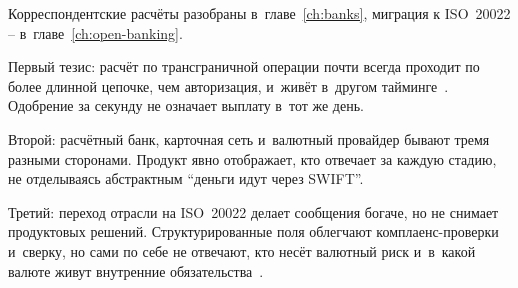 Корреспондентские расчёты разобраны в~главе~\ref{ch:banks},
миграция к ISO~20022 -- в~главе~\ref{ch:open-banking}.

Первый тезис: расчёт по трансграничной операции почти всегда
проходит по более длинной цепочке, чем авторизация, и~живёт
в~другом тайминге~\cite{fatf-correspondent-banking,swift-instant-interoperability}.
Одобрение за секунду не означает выплату в~тот же день.

Второй: расчётный банк, карточная сеть и~валютный провайдер
бывают тремя разными сторонами. Продукт явно отображает,
кто отвечает за каждую стадию, не отделываясь абстрактным
\enquote{деньги идут через SWIFT}.

Третий: переход отрасли на ISO~20022 делает сообщения богаче,
но не снимает продуктовых решений. Структурированные поля
облегчают комплаенс-проверки и~сверку, но сами по себе
не отвечают, кто несёт валютный риск и~в~какой валюте живут
внутренние обязательства~\cite{iso-20022,swift-iso20022-milestone,swift-transaction-manager-iso20022}.
